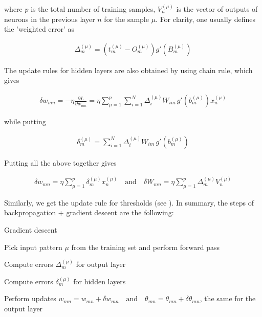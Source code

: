 \noindent where $ p $ is the total number of training samples, $ V_{n}^{(\mu)} $ is the vector of outputs of neurons in the previous layer $ n $ for the sample $ \mu $. For clarity, one usually defines the 'weighted error' as \cite{mehlig}

\begin{gather}
	\Delta_{m}^{(\mu)} = (t_{m}^{(\mu)} - O_{m}^{(\mu)})   g'(B_{m}^{(\mu)})
\end{gather}

\noindent The update rules for hidden layers are also obtained by using chain rule, which gives \cite{mehlig}

\begin{gather}
\delta w_{mn} = - \eta \frac{\partial L}{\partial w_{mn}} = \eta \sum\limits_{\mu=1}^{p} \sum\limits_{i=1}^{N}
\Delta_{i}^{(\mu)} W_{im} \, g'(b_{m}^{(\mu)}) x_{n}^{(\mu)}
\end{gather}

\noindent while putting \cite{mehlig}

\begin{gather}
\delta_{m}^{(\mu)} = \sum\limits_{i=1}^{N} \Delta_{i}^{(\mu)} W_{im} \, g'(b_{m}^{(\mu)})
\end{gather}

\noindent Putting all the above together gives \cite{mehlig}

\begin{gather}
\label{update_rule}
\delta w_{mn} = \eta \sum\limits_{\mu=1}^{p} \delta_{m}^{(\mu)} x_{n}^{(\mu)}
\quad \text{and} \quad 
\delta W_{mn} = \eta \sum\limits_{\mu=1}^{p} \Delta_{m}^{(\mu)} V_{n}^{(\mu)}	
\end{gather}

\noindent Similarly, we get the update rule for thresholds (see \cite{mehlig}). In summary, the steps of backpropagation + gradient descent are the following: \cite{mehlig}
\vspace{5mm}
\begin{algorithm}
	\caption{Gradient descent \cite{mehlig}}
	\begin{algorithmic}[1]
		\item Pick input pattern $ \mu $ from the training set and perform forward pass
		\item Compute errors $ \Delta_{m}^{(\mu)} $ for output layer
		\item Compute errors $ \delta_{m}^{(\mu)} $ for hidden layers
		\item Perform updates $w_{mn} = w_{mn} + \delta w_{mn} \quad \text{and} \quad \theta_{mn} = \theta_{mn} + \delta \theta_{mn}$, the same for the output layer
	\end{algorithmic}
\end{algorithm}

